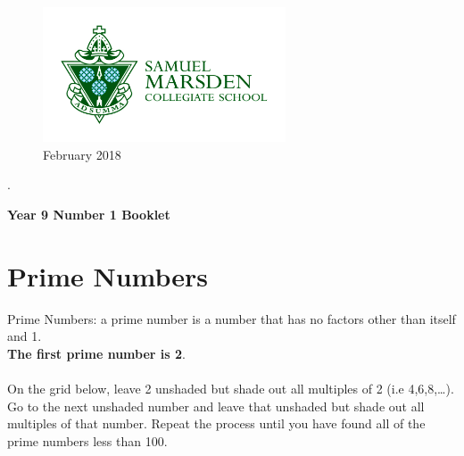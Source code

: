 \documentclass[a4paper,12pt]{article}
\begin{document}
\thispagestyle{empty}	
	\Large
	\begin{figure} 
		\centering
		\includegraphics[height=4cm]{Marsden_green_on_white.jpg}
		\caption*{February 2018}
	\end{figure}
	.
\vspace{3cm}
	\begin{center}
			\textbf{Year 9 Number 1 Booklet}
	\end{center}

	\vspace{3cm}
	
	\normalsize
	\newpage
	\tableofcontents
	\newpage
	
	\section{Prime Numbers}
	Prime Numbers: a prime number is a number that has no factors other than itself and 1.\\
	\textbf{The first prime number is 2}.\\\\
	On the grid below, leave 2 unshaded but shade out all multiples of 2 (i.e 4,6,8,…).\\ 
	Go to the next unshaded number and leave that unshaded but shade out all multiples of that number.
	Repeat the process until you have found all of the prime numbers less than 100.
	
	\begin{center}
\end{center}
\end{document}
